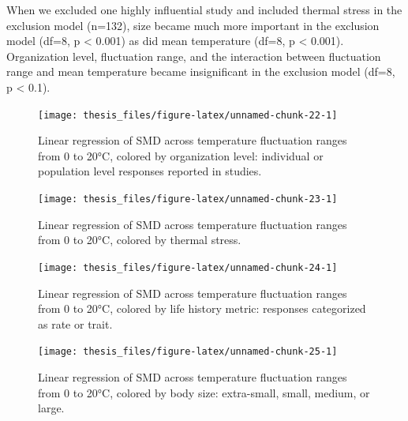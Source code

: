 \documentclass[12pt,twoside]{reedthesis}
\begin{document}
When we excluded one highly influential study and included thermal stress in the exclusion model (n=132), size became much more important in the exclusion model (df=8, p \textless{} 0.001) as did mean temperature (df=8, p \textless{} 0.001). Organization level, fluctuation range, and the interaction between fluctuation range and mean temperature became insignificant in the exclusion model (df=8, p \textless{} 0.1).
\begin{figure}

{\centering \texttt{[image: thesis\_files/figure-latex/unnamed-chunk-22-1]} 

}

\caption[Effect sizes across temperature range by organization level]{Linear regression of SMD across temperature fluctuation ranges from 0 to 20°C, colored by organization level: individual or population level responses reported in studies.}\label{fig:unnamed-chunk-22}
\end{figure}
\clearpage
\begin{figure}

{\centering \texttt{[image: thesis\_files/figure-latex/unnamed-chunk-23-1]} 

}

\caption[Effect sizes across temperature range by thermal stress]{Linear regression of SMD across temperature fluctuation ranges from 0 to 20°C, colored by thermal stress.}\label{fig:unnamed-chunk-23}
\end{figure}
\begin{figure}

{\centering \texttt{[image: thesis\_files/figure-latex/unnamed-chunk-24-1]} 

}

\caption[Effect sizes across temperature range by response type]{Linear regression of SMD across temperature fluctuation ranges from 0 to 20°C, colored by life history metric: responses categorized as rate or trait.}\label{fig:unnamed-chunk-24}
\end{figure}
\begin{figure}

{\centering \texttt{[image: thesis\_files/figure-latex/unnamed-chunk-25-1]} 

}

\caption[Effect sizes across temperature range by body size]{Linear regression of SMD across temperature fluctuation ranges from 0 to 20°C, colored by body size: extra-small, small, medium, or large.}\label{fig:unnamed-chunk-25}
\end{figure}
\end{document}
